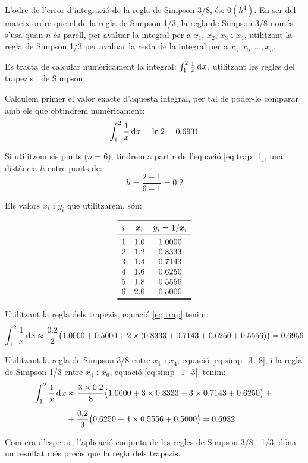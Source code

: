  L'odre de l'error d'integraci\'{o} de la regla de Simpson 3/8, \'{e}s: $0(h^4)$. En ser del mateix ordre que el de la regla de Simpson 1/3, la regla de Simpson 3/8 nom\'{e}s s'usa quan $n$ \'{e}s parell, per avaluar la integral per a $x_1$, $x_2$, $x_3$ i $x_4$, utilitzant la regla de Simpson 1/3 per avaluar la resta de la integral per a  $x_4, x_5, \dotsc , x_n$.

\begin{exemple}
    Es tracta de calcular num\`{e}ricament la integral: $\int_1^2 \frac{1}{x} \diff x$, utilitzant les regles del trapezis i de Simpson.

    Calculem primer el valor exacte d'aquesta integral, per tal de poder-lo comparar amb els que obtindrem  num\`{e}ricament:
    \[
      \int_1^2 \frac{1}{x} \diff x = \ln 2 = \num{0,6931}
    \]

    Si utilitzem sis punts ($n=6$), tindrem a partir de l'equaci\'{o} \eqref{eq:trap_1}, una dist\`{a}ncia $h$ entre punts de:
    \[
        h = \frac{2-1}{6-1} = \num{0,2}
    \]

    Els valors $x_i$ i $y_i$ que utilitzarem, s\'{o}n:
    \vspace{-8mm}
    \begin{center}
        \[\begin{array}{ccc}
           \toprule[1pt]
              i & x_i  & y_i = 1/x_i \\
           \midrule
              1 & \num{1,0} & \num{1,0000} \\
              2 & \num{1,2} & \num{0,8333} \\
              3 & \num{1,4} & \num{0,7143} \\
              4 & \num{1,6} & \num{0.6250} \\
              5 & \num{1,8} & \num{0.5556} \\
              6 & \num{2,0} & \num{0,5000} \\
           \bottomrule[1pt]
        \end{array} \]
    \end{center}

    Utilitzant la regla dels trapezis, equaci\'{o} \eqref{eq:trap},tenim:
    \[
        \int_1^2 \frac{1}{x} \diff x \approx \frac{\num{0,2}}{2} \big(\num{1,0000}+\num{0,5000} +2 \times(\num{0,8333}+ \num{0,7143} +
        \num{0,6250} + \num{0,5556}) \big) = \num{0,6956}
    \]

    Utilitzant la regla de Simpson 3/8 entre $x_1$ i $x_4$, equaci\'{o} \eqref{eq:simp_3_8}, i la  regla de Simpson 1/3 entre $x_4$ i $x_6$, equaci\'{o} \eqref{eq:simp_1_3}, tenim:
    \[\begin{split}
        \int_1^2 \frac{1}{x} \diff x &\approx \frac{3\times\num{0,2}}{8} \big(\num{1,0000}+3\times\num{0,8333} +3\times \num{0,7143} +
        \num{0,6250} \big) +{}\\[0.5em]
        {}&+ \frac{\num{0,2}}{3} \big(\num{0,6250} +4\times \num{0,5556} + \num{0,5000} \big)
        = \num{0,6932}
    \end{split}\]

    Com era d'esperar, l'aplicaci\'{o} conjunta de les regles de Simpson 3/8 i 1/3, d\'{o}na un resultat m\'{e}s prec\'{\i}s que la regla dels trapezis.
\end{exemple}

